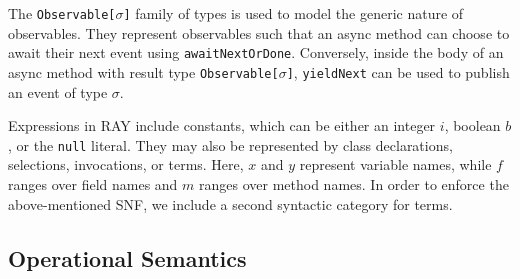 \documentclass{acm_proc_article-sp}
\begin{document}
The \texttt{Observable[$\sigma$]} family of types is used to model the
generic nature of observables. They represent observables such that an async
method can choose to await their next event using \texttt{awaitNextOrDone}.
Conversely, inside the body of an async method with result type
\texttt{Observable[$\sigma$]}, \texttt{yieldNext} can be used to publish an
event of type $\sigma$.

Expressions in RAY include constants, which can be either an integer $i$,
boolean $b$, or the \texttt{null} literal. They may also be represented by
class declarations, selections, invocations, or terms. Here, $x$ and $y$
represent variable names, while $f$ ranges over field names and $m$ ranges
over method names. In order to enforce the above-mentioned SNF, we include a
second syntactic category for terms.


\subsection{Operational Semantics}
\end{document}

